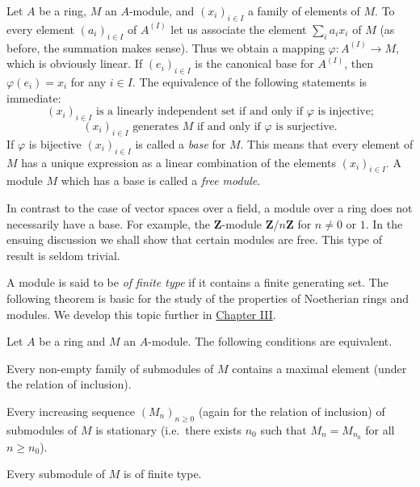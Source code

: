 Let $A$ be a ring, $M$ an $A$-module, and $(x_{i})_{i\in I}$ a family of
elements of $M$. To every element $(a_{i})_{i\in I}$ of $A^{(I)}$ let us
associate the element $\sum_{i}a_{i}x_{i}$ of $M$ (as before, the summation
makes sense). Thus we obtain a mapping $\varphi:A^{(I)}\to M$, which is
obviously linear. If $(e_{i})_{i\in I}$ is the canonical base for $A^{(I)}$,
then $\varphi(e_{i})=x_{i}$ for any $i\in I$. The equivalence of the
following statements is immediate:
\begin{equation}
(x_{i})_{i\in I}\text{ is a linearly independent set if and only if }
\varphi\text{ is injective;}
\label{eq:I.4.2}
\end{equation}
\begin{equation}
(x_{i})_{i\in I}\text{ generates }M\text{ if and only if }\varphi
\text{ is surjective.}
\label{eq:I.4.3}
\end{equation}
If $\varphi$ is bijective $(x_{i})_{i\in I}$ is called a \emph{base} for
$M$. This means that every element of $M$ has a unique expression as a
linear combination of the elements $(x_{i})_{i\in I}$. A module $M$ which
has a base is called a \emph{free module}.

In contrast to the case of vector spaces over a field, a module over a ring
does not necessarily have a base. For example, the $\mathbf{Z}$-module
$\mathbf{Z}/n\mathbf{Z}$ for $n\neq0$ or $1$. In the ensuing discussion we
shall show that certain modules are free. This type of result is seldom
trivial.

A module is said to be \emph{of finite type} if it contains a finite
generating set. The following theorem is basic for the study of the
properties of Noetherian rings and modules. We develop this topic further in
\hyperref[chap:III]{Chapter III}.

\begin{theorem}
\label{thm:I.4.1}
Let $A$ be a ring and $M$ an $A$-module. The following conditions are
equivalent.
\begin{alist}
\item Every non-empty family of submodules of $M$ contains a maximal element
(under the relation of inclusion).
\item Every increasing sequence $(M_{n})_{n\geq0}$ (again for the relation
of inclusion) of submodules of $M$ is stationary (i.e.\ there exists $n_{0}$
such that $M_{n}=M_{n_{0}}$ for all $n\geq n_{0}$).
\item Every submodule of $M$ is of finite type.
\end{alist}
\end{theorem}

